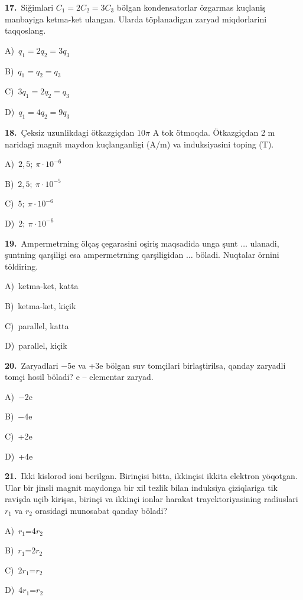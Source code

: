 \documentclass[11pt,a4paper]{article}
\newcommand{\opt}[2]{\hspace*{4mm}#1)\ #2\par}
\begin{document}
\noindent\begin{minipage}{\linewidth}
\textbf{17.}\ Siğimlari $C_1 = 2C_2 = 3C_3$ bölgan kondensatorlar özgarmas kuçlaniş manbayiga ketma-ket ulangan. Ularda töplanadigan zaryad miqdorlarini taqqoslang.\par\smallskip
\opt{A}{$q_1 = 2q_2 = 3q_3$}
\opt{B}{$q_1 = q_2 = q_3$}
\opt{C}{$3q_1 = 2q_2 = q_3$}
\opt{D}{$q_1 = 4q_2 = 9q_3$}
\end{minipage}\vspace{9pt}\par
\noindent\begin{minipage}{\linewidth}
\textbf{18.}\ Çeksiz uzunlikdagi ötkazgiçdan $10\pi$ A tok ötmoqda. Ötkazgiçdan 2 m naridagi magnit maydon kuçlanganligi (A/m) va induksiyasini toping (T).\par\smallskip
\opt{A}{$2{,}5;\ \pi\cdot10^{-6}$}
\opt{B}{$2{,}5;\ \pi\cdot10^{-5}$}
\opt{C}{$5;\ \pi\cdot10^{-6}$}
\opt{D}{$2;\ \pi\cdot10^{-6}$}
\end{minipage}\vspace{9pt}\par
\noindent\begin{minipage}{\linewidth}
\textbf{19.}\ Ampermetrning ölçaş çegarasini oşiriş maqsadida unga şunt $\ldots$ ulanadi, şuntning qarşiligi esa ampermetrning qarşiligidan $\ldots$ böladi. Nuqtalar örnini töldiring.\par\smallskip
\opt{A}{ketma-ket, katta}
\opt{B}{ketma-ket, kiçik}
\opt{C}{parallel, katta}
\opt{D}{parallel, kiçik}
\end{minipage}\vspace{9pt}\par
\noindent\begin{minipage}{\linewidth}
\textbf{20.}\ Zaryadlari $-$5e va +3e bölgan suv tomçilari birlaştirilsa, qanday zaryadli tomçi hosil böladi? e – elementar zaryad.\par\smallskip
\opt{A}{$-$2e}
\opt{B}{$-$4e}
\opt{C}{+2e}
\opt{D}{+4e}
\end{minipage}\vspace{9pt}\par
\noindent\begin{minipage}{\linewidth}
\textbf{21.}\ Ikki kislorod ioni berilgan. Birinçisi bitta, ikkinçisi ikkita elektron yöqotgan. Ular bir jinsli magnit maydonga bir xil tezlik bilan induksiya çiziqlariga tik ravişda uçib kirişsa, birinçi va ikkinçi ionlar harakat trayektoriyasining radiuslari $r_1$ va $r_2$ orasidagi munosabat qanday böladi?\par\smallskip
\opt{A}{$r_1$=4$r_2$}
\opt{B}{$r_1$=2$r_2$}
\opt{C}{2$r_1$=$r_2$}
\opt{D}{4$r_1$=$r_2$}
\end{minipage}\vspace{9pt}\par
\end{document}
